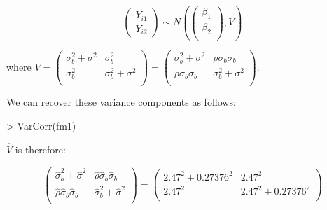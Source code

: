 \documentclass[12pt]{amsart}
\begin{document}
\begin{equation}
\begin{pmatrix}
Y_{i1}\\
Y_{i2}
\end{pmatrix}
\sim
N\left(
\begin{pmatrix}
\beta_1\\
\beta_2\\
\end{pmatrix}
,
V
\right)
\end{equation}

where $V =\begin{pmatrix}
\sigma_b^2 + \sigma^2 & \sigma_b^2\\
\sigma_b^2 & \sigma_b^2 + \sigma^2\\
\end{pmatrix}
=
\begin{pmatrix}
\sigma^2_{b} + \sigma^2  &  \rho\sigma_{b}\sigma_{b}\\
\rho\sigma_{b}\sigma_{b} & \sigma^2_{b}+\sigma^2  \\       
\end{pmatrix}$.

We can recover these variance components as follows:

\begin{Schunk}
\begin{Sinput}
> VarCorr(fm1)
\end{Sinput}
\end{Schunk}

$$ is therefore:

\begin{equation}
\begin{pmatrix}
\hat{\sigma}^2_{b} + \hat{\sigma}^2  &  \hat{\rho}\hat{\sigma}_{b}\hat{\sigma}_{b}\\
\hat{\rho}\hat{\sigma}_{b}\hat{\sigma}_{b} & \hat{\sigma}^2_{b}+\hat{\sigma}^2  \\       
\end{pmatrix}=
\begin{pmatrix}
2.47^2 + 0.27376^2 & 2.47^2\\
2.47^2 & 2.47^2 + 0.27376^2\\
\end{pmatrix}
\end{equation}
\end{document}
